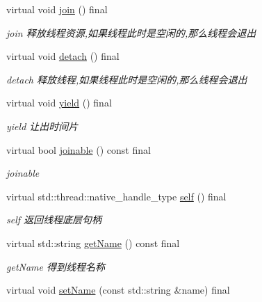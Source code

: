 \begin{DoxyCompactItemize}
\mbox{\label{classThread_a07b23d8d75300651cba3eb79652c77fd}} 
virtual void \hyperlink{classThread_a07b23d8d75300651cba3eb79652c77fd}{join} () final
\begin{DoxyCompactList}\small\item\em join 释放线程资源,如果线程此时是空闲的,那么线程会退出 \end{DoxyCompactList}\item 
\mbox{\label{classThread_affb34b8590eab79785627ae48cbd297d}} 
virtual void \hyperlink{classThread_affb34b8590eab79785627ae48cbd297d}{detach} () final
\begin{DoxyCompactList}\small\item\em detach 释放线程,如果线程此时是空闲的,那么线程会退出 \end{DoxyCompactList}\item 
\mbox{\label{classThread_ac09e8b8ff4fb0a97315b5a501e722783}} 
virtual void \hyperlink{classThread_ac09e8b8ff4fb0a97315b5a501e722783}{yield} () final
\begin{DoxyCompactList}\small\item\em yield 让出时间片 \end{DoxyCompactList}\item 
virtual bool \hyperlink{classThread_a86d1c278c0b9fea63037c437a909064f}{joinable} () const final
\begin{DoxyCompactList}\small\item\em joinable \end{DoxyCompactList}\item 
virtual std\+::thread\+::native\+\_\+handle\+\_\+type \hyperlink{classThread_a554185abbfacbcc4bf2e953cdddcbbba}{self} () final
\begin{DoxyCompactList}\small\item\em self 返回线程底层句柄 \end{DoxyCompactList}\item 
virtual std\+::string \hyperlink{classThread_a19bc237f8a86727a5a4b516122fe20f6}{get\+Name} () const final
\begin{DoxyCompactList}\small\item\em get\+Name 得到线程名称 \end{DoxyCompactList}\item 
virtual void \hyperlink{classThread_ae816904b2a3e248472813e17c2b12a71}{set\+Name} (const std\+::string \&name) final

\end{DoxyCompactItemize}
